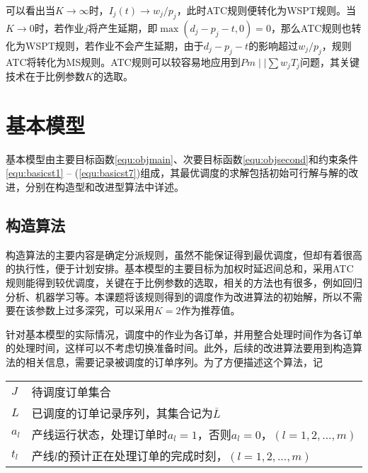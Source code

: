 可以看出当$K \to \infty$时，$I_j(t) \to w_j/p_j$，此时ATC规则便转化为WSPT规则。当$K \to 0$时，若作业$j$将产生延期，即$\max(d_j - p_j -t , 0 ) = 0$，那么ATC规则也转化为WSPT规则，若作业不会产生延期，由于$d_j - p_j - t$的影响超过$w_j/p_j$，规则ATC将转化为MS规则。ATC规则可以较容易地应用到$Pm\mid\mid \sum w_jT_j$问题，其关键技术在于比例参数$K$的选取。

\section{基本模型}
基本模型由主要目标函数\eqref{equ:objmain}、次要目标函数\eqref{equ:objsecond}和约束条件\eqref{equ:basicst1} -- (\ref{equ:basicst7})组成，其最优调度的求解包括初始可行解与解的改进，分别在构造型和改进型算法中详述。
\subsection{构造算法}
构造算法的主要内容是确定分派规则，虽然不能保证得到最优调度，但却有着很高的执行性，便于计划安排。基本模型的主要目标为加权时延迟间总和，采用ATC规则能得到较优调度，关键在于比例参数的选取，相关的方法也有很多，例如回归分析、机器学习等。本课题将该规则得到的调度作为改进算法的初始解，所以不需要在该参数上过多深究，可以采用$K = 2$作为推荐值\cite{bilge2007tabu}。

针对基本模型的实际情况，调度中的作业为各订单，并用整合处理时间作为各订单的处理时间，这样可以不考虑切换准备时间。此外，后续的改进算法要用到构造算法的相关信息，需要记录被调度的订单序列。为了方便描述这个算法，记

\begin{tabular}{ll}
$J$ & 待调度订单集合\\
$L$ & 已调度的订单记录序列，其集合记为$\overline{L}$\\
$a_l$ & 产线运行状态，处理订单时$a_l = 1$，否则$a_l = 0$，$(l = 1,2,...,m)$\\
$t_l$ & 产线$l$的预计正在处理订单的完成时刻，$(l = 1,2,...,m)$
\end{tabular}

